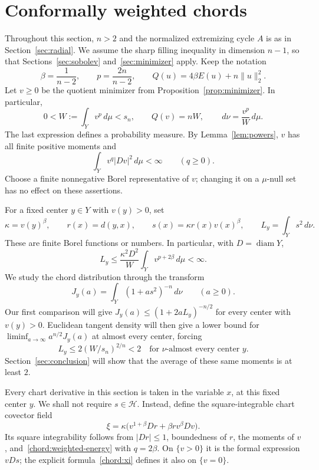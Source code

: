 \documentclass[11pt]{article}
\numberwithin{equation}{section}
\theoremstyle{definition}
\theoremstyle{remark}
\begin{document}
\section{Conformally weighted chords}\label{sec:chords}

Throughout this section, $n>2$ and the normalized extremizing cycle
$A$ is as in Section~\ref{sec:radial}. We assume the sharp filling
inequality in dimension $n-1$, so that Sections~\ref{sec:sobolev}
and~\ref{sec:minimizer} apply. Keep the notation
\[
 \beta=\frac1{n-2},\qquad p=\frac{2n}{n-2},\qquad
 Q(u)=4\beta E(u)+n\lVert u\rVert_2^2.
\]
Let $v\ge0$ be the quotient minimizer from
Proposition~\ref{prop:minimizer}. In particular,
\begin{equation}\label{chord:normalization}
 0<W:=\int_Y v^p\,d\mu<s_n,\qquad Q(v)=nW,
 \qquad \,d\nu=\frac{v^p}{W}\,d\mu.
\end{equation}
The last expression defines a probability measure. By
Lemma~\ref{lem:powers}, $v$ has all finite positive moments and
\begin{equation}\label{chord:weighted-energy}
 \int_Y v^q\lvert Dv\rvert^2\,d\mu<\infty\qquad(q\ge0).
\end{equation}
Choose a finite nonnegative Borel representative of $v$; changing
it on a $\mu$-null set has no effect on these assertions.

For a fixed center $y\in Y$ with $v(y)>0$, set
\begin{equation}\label{chord:data}
 \kappa=v(y)^\beta,\qquad r(x)=d(y,x),\qquad
 s(x)=\kappa r(x)v(x)^\beta,
 \qquad L_y=\int_Y s^2\,d\nu.
\end{equation}
These are finite Borel functions or numbers. In particular, with
$D=\operatorname{diam} Y$,
\[
 L_y\le\frac{\kappa^2D^2}{W}
             \int_Y v^{p+2\beta}\,d\mu<\infty.
\]
We study the chord distribution through the transform
\begin{equation}\label{chord:transform-definition}
 J_y(a)=\int_Y(1+as^2)^{-n}\,d\nu\qquad(a\ge0).
\end{equation}
Our first comparison will give
$J_y(a)\le(1+2aL_y)^{-n/2}$ for every center with $v(y)>0$.
Euclidean tangent density will then give a lower bound for
$\liminf_{a\to\infty}a^{n/2}J_y(a)$ at almost every center, forcing
\[
 L_y\le2(W/s_n)^{2/n}<2
 \quad\text{for $\nu$-almost every center $y$}.
\]
Section~\ref{sec:conclusion} will show that the average of these same
moments is at least $2$.

Every chart derivative in this section is taken in the variable
$x$, at this fixed center $y$. We shall not require $s\in\mathcal H$.
Instead, define the square-integrable chart covector field
\begin{equation}\label{chord:xi}
 \xi=\kappa\bigl(v^{1+\beta}Dr
                   +\beta r v^\beta Dv\bigr).
\end{equation}
Its square integrability follows from $\lvert Dr\rvert\le1$, boundedness
of $r$, the moments of $v$, and~\eqref{chord:weighted-energy} with
$q=2\beta$. On $\{v>0\}$ it is the formal expression $vDs$;
the explicit formula~\eqref{chord:xi} defines it also on $\{v=0\}$.
\end{document}
